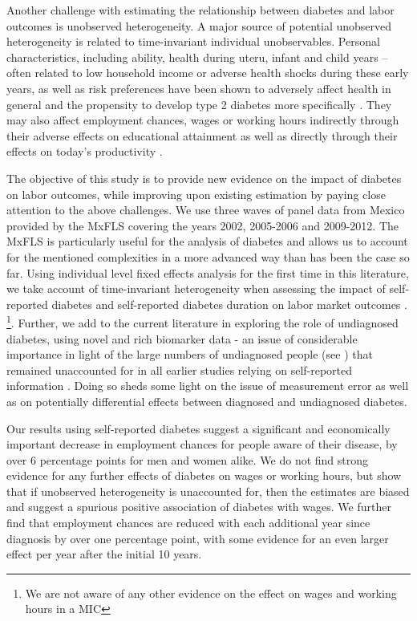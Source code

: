 \documentclass[12pt,english,british]{article}
\begin{document}
Another challenge with estimating the relationship between diabetes and labor outcomes is unobserved heterogeneity. 
A major source of potential unobserved heterogeneity is related to time-invariant individual unobservables. Personal characteristics, including ability, health during uteru, infant and child years -- often related to low household income or adverse health shocks during these early years, as well as risk preferences have been shown to adversely affect health in general and 
the propensity to develop type 2 diabetes more specifically \citep{VanEwijk2011,Sotomayor2013,Li2010b}.
They may also affect employment chances, wages or working hours indirectly
through their adverse effects on educational attainment \citep{Ayyagari2011a}
as well as directly through their effects on today's productivity
\citep{Currie2013}.

The objective of this study is 
to provide new evidence on the impact of diabetes on labor outcomes, while improving upon existing estimation by paying close attention to the above challenges. We use three waves  of panel data from Mexico provided by the \ac{MxFLS} covering the years 2002, 2005-2006 and 2009-2012. The \ac{MxFLS} is particularly useful for the analysis of diabetes and allows us to account for the mentioned complexities in a more advanced way than has been the case so far. Using individual level fixed effects analysis for the first time in this literature, we take account of time-invariant heterogeneity when assessing the impact of self-reported diabetes and self-reported diabetes duration on labor market outcomes   . \footnote{We are not aware of any other evidence on the effect on wages and working hours in a \ac{MIC}}. Further, we add to the current literature in exploring the role of undiagnosed diabetes, using novel and rich biomarker data - an issue of considerable importance in light of the large numbers of undiagnosed people (see \citet{Beagley2014}) that remained unaccounted for in all earlier studies relying on self-reported information . Doing so sheds some light on the issue of measurement error as well as on potentially differential effects between diagnosed and undiagnosed diabetes. 

Our results using self-reported diabetes suggest a significant and economically important decrease in employment chances for people aware of their disease, by over 6 percentage points for men and women alike. We do not find strong evidence for any further effects of diabetes on wages or working hours, but show that if unobserved heterogeneity is unaccounted for, then the estimates are biased and suggest a spurious positive association of diabetes with wages. We further find that employment chances are reduced with each additional year since diagnosis by over one percentage point, with some evidence for an even larger effect per year after the initial 10 years. 
\end{document}
